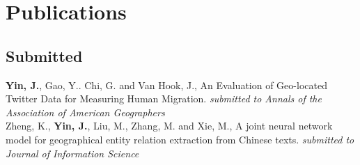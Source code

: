 \documentclass[11pt, a4paper]{article}
\newcommand{\years}[1]{\marginnote{\scriptsize #1}}
\begin{document}
\section*{Publications}
\subsection*{Submitted}
\years{2020} \textbf{Yin, J.}, Gao, Y.. Chi, G. and Van Hook, J., An Evaluation of Geo-located Twitter Data for Measuring Human Migration. \textit{submitted to Annals of the Association of American Geographers}\\
\years{2020}Zheng, K., \textbf{Yin, J.}, Liu, M., Zhang, M. and Xie, M., A joint neural network model for geographical entity relation extraction from Chinese texts. \textit{submitted to Journal of Information Science}\\
\end{document}
